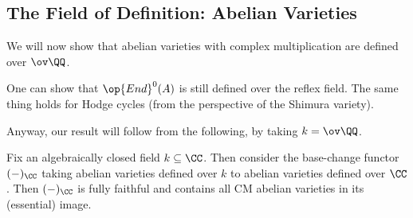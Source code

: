 \documentclass[../notes.tex]{subfiles}
\begin{document}
\subsection{The Field of Definition: Abelian Varieties}
We will now show that abelian varieties with complex multiplication are defined over $\ov\QQ$.
\begin{remark}
	One can show that $\op{End}^0(A)$ is still defined over the reflex field. The same thing holds for Hodge cycles (from the perspective of the Shimura variety).
\end{remark}
Anyway, our result will follow from the following, by taking $k=\ov\QQ$.
\begin{proposition} \label{prop:base-change-av}
	Fix an algebraically closed field $k\subseteq\CC$. Then consider the base-change functor $(-)_\CC$ taking abelian varieties defined over $k$ to abelian varieties defined over $\CC$. Then $(-)_\CC$ is fully faithful and contains all CM abelian varieties in its (essential) image.
\end{proposition}
\end{document}
